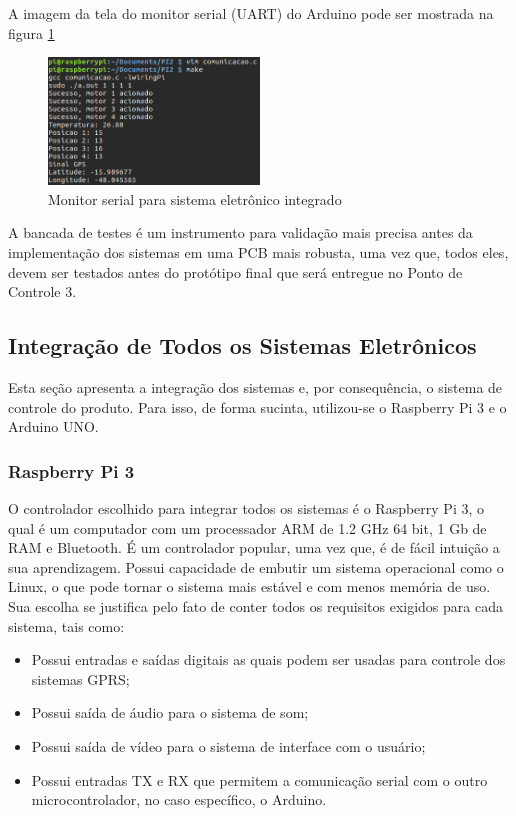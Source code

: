 A imagem da tela do monitor serial (UART) do Arduino pode ser mostrada na figura \ref{fig:serial_bancada}

\begin{figure}[H]
\centering
\includegraphics[width=0.5\textwidth]{figuras/serial_bancada}
 \caption{Monitor serial para sistema eletrônico integrado}
\label{fig:serial_bancada}
\end{figure}

A bancada de testes é um instrumento para validação mais precisa antes da implementação dos sistemas em uma PCB mais robusta, uma vez que, todos eles, devem ser testados antes do protótipo final que será entregue no Ponto de Controle 3.

\subsection{Integração de Todos os Sistemas Eletrônicos}
 Esta seção apresenta a integração dos sistemas e, por consequência, o sistema de controle do produto. Para isso, de forma sucinta,  utilizou-se o Raspberry Pi 3 e o Arduino UNO.

\subsubsection{Raspberry Pi 3}

O controlador escolhido para integrar todos os sistemas é o Raspberry Pi 3, o qual é um computador com um processador ARM de 1.2 GHz 64 bit, 1 Gb de RAM e Bluetooth. É um controlador popular, uma vez que, é de fácil intuição a sua aprendizagem. Possui capacidade de embutir um sistema operacional como o Linux, o que pode tornar o sistema mais estável e com menos memória de uso. Sua escolha se justifica pelo fato de conter todos os requisitos exigidos para cada sistema, tais como:

\begin{itemize}
  \item Possui entradas e saídas digitais as quais podem ser usadas para controle dos sistemas GPRS;
  \item Possui saída de áudio para o sistema de som;
  \item Possui saída de vídeo para o sistema de interface com o usuário;
  \item Possui entradas TX e RX que permitem a comunicação serial com o outro microcontrolador, no caso específico, o Arduino.
\end{itemize}

